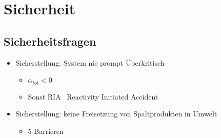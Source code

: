 \documentclass[12pt]{article}
\begin{document}
\section{Sicherheit}

\subsection{Sicherheitsfragen}
\begin{itemize}
  \item Sicherstellung: System nie prompt Überkritisch 
  \begin{itemize}
    \item \(\alpha_{tot} < 0\)
    \item Sonst RIA \textrightarrow\ Reactivity Initiated Accident
  \end{itemize}
  \item Sicherstellung: keine Freisetzung von Spaltprodukten in Umwelt
  \begin{itemize}
    \item 5 Barrieren
  \end{itemize}
\end{itemize}
\end{document}
